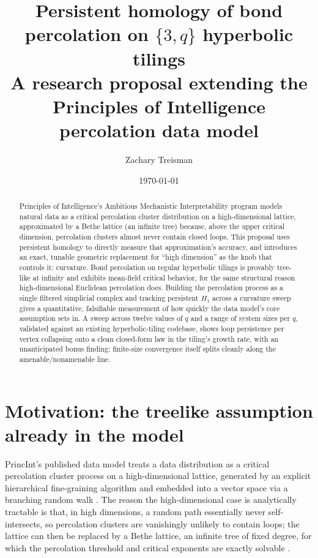 \documentclass[11pt]{article}
\title{Persistent homology of bond percolation on $\{3,q\}$ hyperbolic tilings\\[0.4em]
\large A research proposal extending the Principles of Intelligence percolation data model}
\author{Zachary Treisman}
\date{\today}
\begin{document}
\maketitle

\begin{abstract}
Principles of Intelligence's Ambitious Mechanistic Interpretability program models natural data as a critical percolation cluster distribution on a high-dimensional lattice, approximated by a Bethe lattice (an infinite tree) because, above the upper critical dimension, percolation clusters almost never contain closed loops. This proposal uses persistent homology to directly measure that approximation's accuracy, and introduces an exact, tunable geometric replacement for ``high dimension'' as the knob that controls it: curvature. Bond percolation on regular hyperbolic tilings is provably tree-like at infinity and exhibits mean-field critical behavior, for the same structural reason high-dimensional Euclidean percolation does. Building the percolation process as a single filtered simplicial complex and tracking persistent $H_1$ across a curvature sweep gives a quantitative, falsifiable measurement of how quickly the data model's core assumption sets in. A sweep across twelve values of $q$ and a range of system sizes per $q$, validated against an existing hyperbolic-tiling codebase, shows loop persistence per vertex collapsing onto a clean closed-form law in the tiling's growth rate, with an unanticipated bonus finding: finite-size convergence itself splits cleanly along the amenable/nonamenable line.
\end{abstract}

\section{Motivation: the treelike assumption already in the model}

PrincInt's published data model treats a data distribution as a critical percolation cluster process on a high-dimensional lattice, generated by an explicit hierarchical fine-graining algorithm and embedded into a vector space via a branching random walk \citep{brill2024,brill2025lattice}. The reason the high-dimensional case is analytically tractable is that, in high dimensions, a random path essentially never self-intersects, so percolation clusters are vanishingly unlikely to contain loops; the lattice can then be replaced by a Bethe lattice, an infinite tree of fixed degree, for which the percolation threshold and critical exponents are exactly solvable \citep{brill2025lattice,stauffer1994}.
\end{document}
